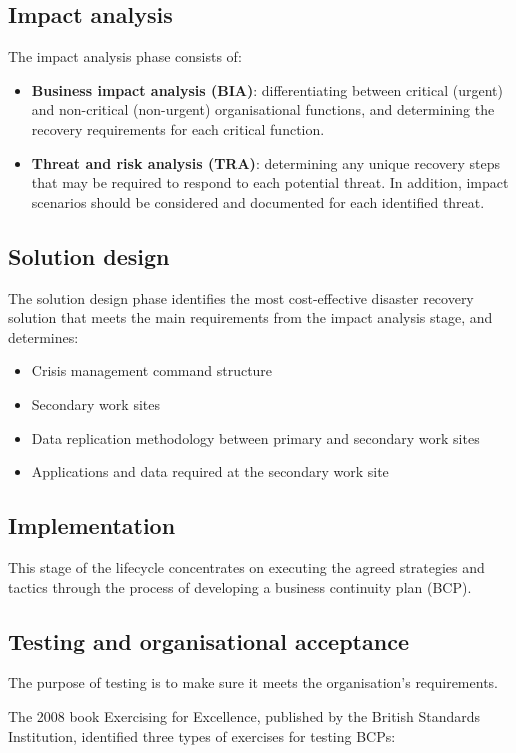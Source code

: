 \documentclass[a4paper,12pt]{article}
\begin{document}
\subsection{ Impact analysis }
The impact analysis phase consists of:

\begin{itemize}
\item \textbf{Business impact analysis (BIA)}: differentiating between critical (urgent) and non-critical (non-urgent) organisational functions, and determining the recovery requirements for each critical function.
\item \textbf{Threat and risk analysis (TRA)}: determining any unique recovery steps that may be required to respond to each potential threat.
In addition, impact scenarios should be considered and documented for each identified threat.
\end{itemize}

\subsection{Solution design}
The solution design phase identifies the most cost-effective disaster recovery solution that meets the main requirements from the impact analysis stage, and determines:

\begin{itemize}
\item Crisis management command structure
\item Secondary work sites
\item Data replication methodology between primary and secondary work sites
\item Applications and data required at the secondary work site
\end{itemize}

\subsection{Implementation}
This stage of the lifecycle concentrates on executing the agreed strategies and tactics through the process of developing a business continuity plan (BCP).

\subsection{Testing and organisational acceptance}
The purpose of testing is to make sure it meets the organisation’s requirements.

The 2008 book Exercising for Excellence, published by the British Standards Institution, identified three types of exercises for testing BCPs:
\end{document}
